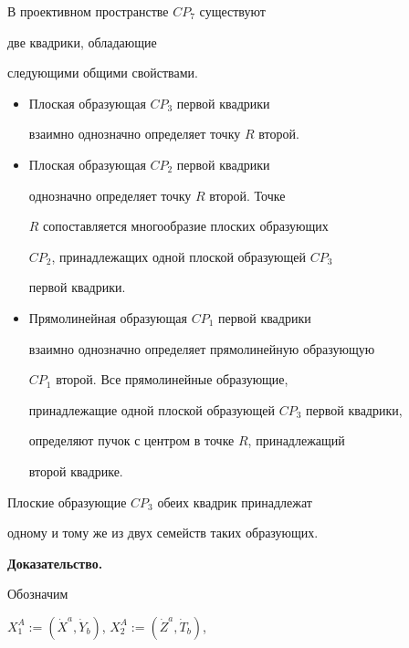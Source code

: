 \begin{thm}


\label{theorem9}


В проективном пространстве $CP_7$ существуют


две квадрики, обладающие


следующими общими свойствами.


\begin{itemize}


\item[1.] Плоская образующая $CP_3$ первой квадрики


взаимно однозначно определяет точку $R$ второй.


\item[2.] Плоская образующая $CP_2$ первой квадрики


однозначно определяет точку $R$ второй. Точке


$R$ сопоставляется многообразие плоских образующих


$CP_2$, принадлежащих одной плоской образующей $CP_3$


первой квадрики.


\item[3.] Прямолинейная образующая $CP_1$ первой квадрики


взаимно однозначно определяет прямолинейную образующую


$CP_1$ второй. Все прямолинейные образующие,


принадлежащие одной плоской образующей $CP_3$ первой квадрики,


определяют пучок с центром в точке $R$, принадлежащий


второй квадрике.


\end{itemize}





Плоские образующие $CP_3$ обеих квадрик принадлежат


одному и тому же из двух семейств таких образующих.


\end{thm}





{\bf Доказательство.}


Обозначим


$X^A_1:=(\Dot X^a,\Dot Y_b)$, $X^A_2:=(\Dot Z^a,\Dot T_b)$,


